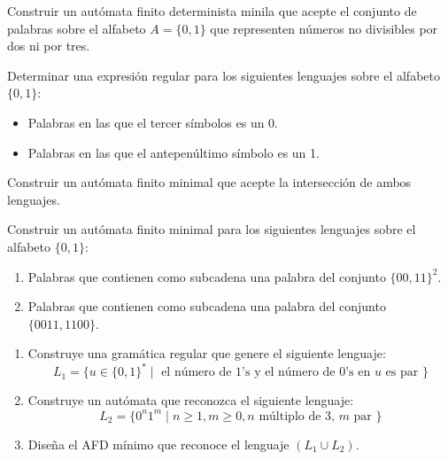\begin{ejercicio}\label{ej:1.3.19}
    Construir un autómata finito determinista minila que acepte el conjunto de palabras sobre el alfabeto $A=\{0,1\}$ que representen números no divisibles por dos ni por tres.
\end{ejercicio}

\begin{ejercicio}\label{ej:1.3.20}
    Determinar una expresión regular para los siguientes lenguajes sobre el alfabeto $\{0,1\}$:
    \begin{itemize}
        \item Palabras en las que el tercer símbolos es un 0.
        \item Palabras en las que el antepenúltimo símbolo es un 1.
    \end{itemize}
    Construir un autómata finito minimal que acepte la intersección de ambos lenguajes.
\end{ejercicio}

\begin{ejercicio}\label{ej:1.3.21}
    Construir un autómata finito minimal para los siguientes lenguajes sobre el alfabeto $\{0,1\}$:
    \begin{enumerate}
        \item Palabras que contienen como subcadena una palabra del conjunto ${\{00,11\}}^{2}$.
        \item Palabras que contienen como subcadena una palabra del conjunto $\{0011,1100\}$.
    \end{enumerate}
\end{ejercicio}

\begin{ejercicio}\label{ej:1.3.22}
    \begin{enumerate}
        \item Construye una gramática regular que genere el siguiente lenguaje:
            \begin{equation*}
                L_1 = \{u\in {\{0,1\}}^{\ast} \mid \text{ el número de 1's y el número de 0's en } u \text{ es par }\}
            \end{equation*}
        \item Construye un autómata que reconozca el siguiente lenguaje:
            \begin{equation*}
                L_2 = \{0^n 1^m \mid n\geq 1, m\geq 0, n \text{ múltiplo de 3, } m \text{ par }\}
            \end{equation*}
            \item Diseña el AFD mínimo que reconoce el lenguaje $(L_1 \cup L_2)$.
    \end{enumerate}
\end{ejercicio}

